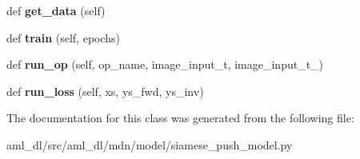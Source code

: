 \begin{DoxyCompactItemize}
def {\bfseries get\+\_\+data} (self)
\item 
\hypertarget{classsrc_1_1aml__dl_1_1mdn_1_1model_1_1siamese__push__model_1_1_siamese_push_model_a564efed65407cce73880dc4afe023697}{}\label{classsrc_1_1aml__dl_1_1mdn_1_1model_1_1siamese__push__model_1_1_siamese_push_model_a564efed65407cce73880dc4afe023697} 
def {\bfseries train} (self, epochs)
\item 
\hypertarget{classsrc_1_1aml__dl_1_1mdn_1_1model_1_1siamese__push__model_1_1_siamese_push_model_af2cb7e4413f33ea09a621d53b0aec3ea}{}\label{classsrc_1_1aml__dl_1_1mdn_1_1model_1_1siamese__push__model_1_1_siamese_push_model_af2cb7e4413f33ea09a621d53b0aec3ea} 
def {\bfseries run\+\_\+op} (self, op\+\_\+name, image\+\_\+input\+\_\+t, image\+\_\+input\+\_\+t\+\_)
\item 
\hypertarget{classsrc_1_1aml__dl_1_1mdn_1_1model_1_1siamese__push__model_1_1_siamese_push_model_abbc61ac03dbcb89bc5fd44489f214b1b}{}\label{classsrc_1_1aml__dl_1_1mdn_1_1model_1_1siamese__push__model_1_1_siamese_push_model_abbc61ac03dbcb89bc5fd44489f214b1b} 
def {\bfseries run\+\_\+loss} (self, xs, ys\+\_\+fwd, ys\+\_\+inv)
\end{DoxyCompactItemize}


The documentation for this class was generated from the following file\+:\begin{DoxyCompactItemize}
\item 
aml\+\_\+dl/src/aml\+\_\+dl/mdn/model/siamese\+\_\+push\+\_\+model.\+py\end{DoxyCompactItemize}
